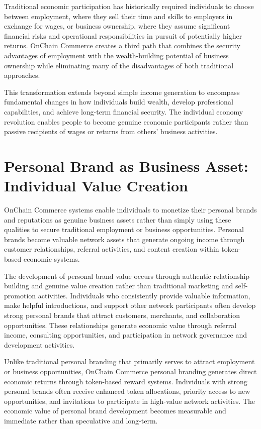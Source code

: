 \documentclass[
  Letterpaper,
]{scrbook}
\begin{document}
Traditional economic participation has historically required individuals
to choose between employment, where they sell their time and skills to
employers in exchange for wages, or business ownership, where they
assume significant financial risks and operational responsibilities in
pursuit of potentially higher returns. OnChain Commerce creates a third
path that combines the security advantages of employment with the
wealth-building potential of business ownership while eliminating many
of the disadvantages of both traditional approaches.

This transformation extends beyond simple income generation to encompass
fundamental changes in how individuals build wealth, develop
professional capabilities, and achieve long-term financial security. The
individual economy revolution enables people to become genuine economic
participants rather than passive recipients of wages or returns from
others' business activities.

\section{Personal Brand as Business Asset: Individual Value
Creation}\label{personal-brand-as-business-asset-individual-value-creation}

OnChain Commerce systems enable individuals to monetize their personal
brands and reputations as genuine business assets rather than simply
using these qualities to secure traditional employment or business
opportunities. Personal brands become valuable network assets that
generate ongoing income through customer relationships, referral
activities, and content creation within token-based economic systems.

The development of personal brand value occurs through authentic
relationship building and genuine value creation rather than traditional
marketing and self-promotion activities. Individuals who consistently
provide valuable information, make helpful introductions, and support
other network participants often develop strong personal brands that
attract customers, merchants, and collaboration opportunities. These
relationships generate economic value through referral income,
consulting opportunities, and participation in network governance and
development activities.

Unlike traditional personal branding that primarily serves to attract
employment or business opportunities, OnChain Commerce personal branding
generates direct economic returns through token-based reward systems.
Individuals with strong personal brands often receive enhanced token
allocations, priority access to new opportunities, and invitations to
participate in high-value network activities. The economic value of
personal brand development becomes measurable and immediate rather than
speculative and long-term.
\end{document}
